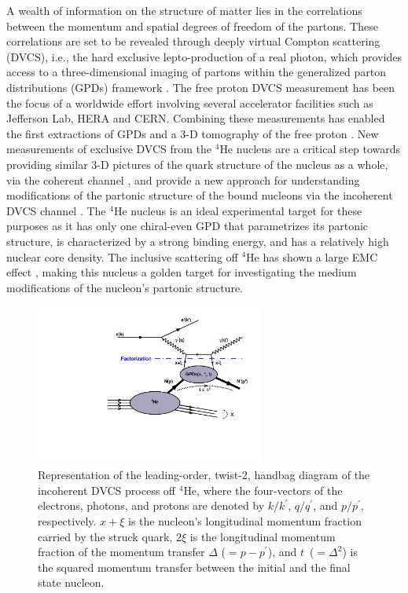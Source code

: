 \documentclass[twocolumn,nofootinbib,showpacs,prl,superscriptaddress,secnumarabic,amssymb,nobibnotes,aps,floatfix]{revtex4}
\begin{document}
A wealth of information on the structure of matter lies in the correlations 
between the momentum and spatial degrees of freedom of the partons. These 
correlations are set to be revealed through deeply virtual Compton scattering 
(DVCS), i.e., the hard exclusive lepto-production of a real photon, which 
provides access to a three-dimensional imaging of partons within the 
generalized parton distributions (GPDs) framework 
\cite{Mueller:1998fv,Ji:1996ek,Ji:1996nm,Radyushkin:1996nd,Radyushkin:1997ki}.   
The free proton DVCS measurement has been the focus of a worldwide effort 
\cite{Stepanyan:2001sm,Airapetian:2001yk,Airapetian:2006zr,Chekanov:2003ya,Aktas:2005ty,Chen:2006na,Munoz 
Camacho:2006hx,Girod:2007aa,Mazouz:2007aa,Gavalian:2009,Seder:2015,Pisano:2015,Jo:2015ema}
involving several accelerator facilities such as Jefferson Lab, HERA and  
CERN. Combining these measurements has enabled the first extractions of GPDs 
and a 3-D tomography of the free proton \cite{Guidal:2013rya,Dupre:2016mai}.  
New measurements of exclusive DVCS from the $^{4}$He nucleus are a critical 
step towards providing similar 3-D pictures of the quark structure of the 
nucleus as a whole, via the coherent channel 
\cite{Airapetian:2009cga,Hattawy:2017woc}, and provide a new approach for 
understanding modifications of the partonic structure of the bound nucleons via 
the incoherent DVCS channel \cite{simonetta_2,Guzey:2006xi,Guzey:2008fe}. The 
$^{4}$He nucleus is an ideal experimental target for these purposes as it has 
only one chiral-even GPD that parametrizes its partonic structure, is 
characterized by a strong binding energy, and has a relatively high nuclear 
core density. The inclusive scattering off $^{4}$He has shown a large EMC 
effect \cite{JSeely}, making this nucleus a golden target for investigating the 
medium modifications of the nucleon's partonic structure. 


\begin{figure}[tb]
\includegraphics[width=7.5cm]{figs/handbag_incoherent.pdf}
\caption{Representation of the leading-order, twist-2, handbag diagram of the 
   incoherent DVCS process off $^4$He, where the four-vectors of the electrons, 
   photons, and protons are denoted by $k/k^\prime$, $q/q^\prime$, and 
   $p/p^\prime$, respectively. $x+\xi$ is the nucleon’s longitudinal momentum 
   fraction carried by the struck quark, 2$\xi$ is the longitudinal momentum 
   fraction of the momentum transfer $\Delta$ ($= p - p^\prime$), and 
   $t$~($=\Delta^2$) is the squared momentum transfer between the initial and
   the final state nucleon.}
\label{fig:diags}
\end{figure}
\end{document}
